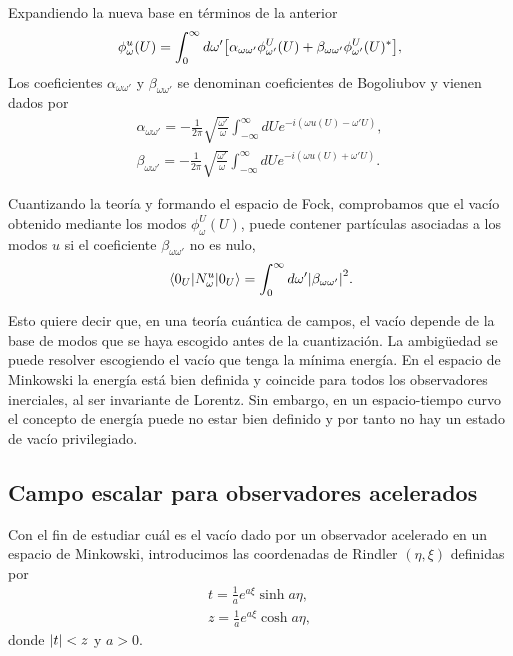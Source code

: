 Expandiendo la nueva base en términos de la anterior
\begin{equation}
  \phi_\omega^u(U) = \int_0^\infty d\omega'\qty[ \alpha_{\omega\omega'} \phi_{\omega'}^U(U) 
  +\beta_{\omega\omega'} \phi_{\omega'}^U(U)^*],
\end{equation}
Los coeficientes $\alpha_{\omega\omega'}$ y $\beta_{\omega\omega'}$ se denominan coeficientes
de Bogoliubov y vienen dados por
\begin{gather}
  \alpha_{\omega\omega'} = -\frac{1}{2\pi}\sqrt{\frac{\omega'}{\omega}}\int_{-\infty}^\infty dU e^{-i(\omega u(U) -\omega' U)},\\
  \beta_{\omega\omega'} = -\frac{1}{2\pi}\sqrt{\frac{\omega'}{\omega}}\int_{-\infty}^\infty dU e^{-i(\omega u(U) +\omega' U)}.
\end{gather}

Cuantizando la teoría y formando el espacio de Fock, comprobamos que el vacío obtenido mediante
los modos $\phi^U_\omega (U)$, puede contener partículas asociadas a los modos $u$
si el coeficiente $\beta_{\omega\omega'}$ no es nulo,
\begin{equation}
  \ev{N_\omega^u}{0_U}=\int_0^\infty d\omega' \abs{\beta_{\omega\omega'}}^2.
\end{equation}

Esto quiere decir que, en una teoría cuántica de campos, el vacío depende de la base de modos
que se haya escogido antes de la cuantización.
La ambigüedad se puede resolver escogiendo el vacío que tenga la mínima energía.
En el espacio de Minkowski la energía está bien definida y coincide para todos los observadores
inerciales, al ser invariante de Lorentz.
Sin embargo, en un espacio-tiempo curvo el concepto de energía puede no estar bien definido
y por tanto no hay un estado de vacío privilegiado.

\subsection{Campo escalar para observadores acelerados}

Con el fin de estudiar cuál es el vacío dado por un observador acelerado en un espacio de 
Minkowski, introducimos las coordenadas de Rindler $(\eta,\xi)$ definidas por
\begin{gather}
  t=\frac{1}{a} e^{a\xi} \sinh a\eta,\\
  z=\frac{1}{a}e^{a\xi} \cosh a\eta,
  \label{eq:rindler}
\end{gather}
donde $\abs{t}<z$ y $a>0$.

